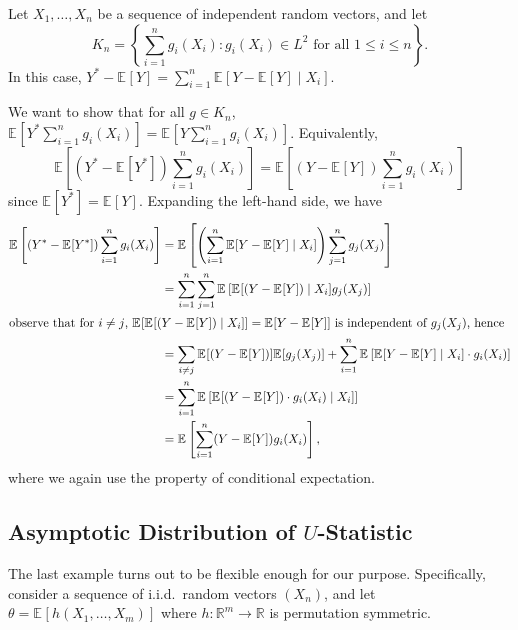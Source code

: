 \begin{eg}\label{eg:projection}
	Let \(X_1, \dots , X_n\) be a sequence of independent random vectors, and let
	\[
		K_n = \left\{ \sum_{i=1}^{n} g_i(X_i) \colon g_i(X_i) \in L^2 \text{ for all } 1 \leq i \leq n \right\}.
	\]
	In this case, \(Y^{\ast} - \mathbb{E}_{}[Y] = \sum_{i=1}^{n} \mathbb{E}_{}[Y - \mathbb{E}_{}[Y] \mid X_i] \).
\end{eg}
\begin{explanation}
	We want to show that for all \(g \in K_n\), \(\mathbb{E}_{}[Y^{\ast} \sum_{i=1}^{n} g_i(X_i)] = \mathbb{E}_{}[Y \sum_{i=1}^{n} g_i(X_i)] \). Equivalently,
	\[
		\mathbb{E}_{}\left[(Y^{\ast} - \mathbb{E}_{}[Y^{\ast} ] ) \sum_{i=1}^{n} g_i(X_i)\right]
		= \mathbb{E}_{}\left[(Y - \mathbb{E}_{}[Y] ) \sum_{i=1}^{n} g_i(X_i)\right]
	\]
	since \(\mathbb{E}_{}[Y^{\ast} ] = \mathbb{E}_{}[Y] \). Expanding the left-hand side, we have
	\begin{align*}
		\mathbb{E}_{}\left[(Y^{\ast} - \mathbb{E}_{}[Y^{\ast} ] ) \sum_{i=1}^{n} g_i(X_i)\right]
		 & = \mathbb{E}_{}\left[\left( \sum_{i=1}^{n} \mathbb{E}_{}[Y - \mathbb{E}_{}[Y] \mid X_i] \right) \sum_{j=1}^{n} g_j(X_j)\right]                                                            \\
		 & = \sum_{i=1}^{n} \sum_{j=1}^{n} \mathbb{E}_{}\left[\mathbb{E}_{}[(Y - \mathbb{E}_{}[Y] ) \mid X_i] g_j(X_j) \right]                                                                       \\
		\shortintertext{observe that for \(i\neq j\), \(\mathbb{E}_{}[\mathbb{E}_{}[(Y - \mathbb{E}_{}[Y] ) \mid X_i ]] = \mathbb{E}_{}[Y - \mathbb{E}_{}[Y] ] \) is independent of \(g_j(X_j)\), hence}
		 & = \sum_{i \neq j} \mathbb{E}_{}[(Y - \mathbb{E}_{}[Y] ) ] \mathbb{E}_{}[g_j(X_j) ] + \sum_{i=1}^{n} \mathbb{E}_{}\left[\mathbb{E}_{}[Y - \mathbb{E}_{}[Y] \mid X_i] \cdot g_i(X_i)\right] \\
		 & =  \sum_{i=1}^{n} \mathbb{E}_{}\left[\mathbb{E}_{}[(Y - \mathbb{E}_{}[Y]) \cdot g_i(X_i) \mid X_i]\right]                                                                                 \\
		 & = \mathbb{E}_{}\left[\sum_{i=1}^{n} (Y - \mathbb{E}_{}[Y] ) g_i(X_i) \right],
	\end{align*}
	where we again use the property of conditional expectation.
\end{explanation}

\subsection{Asymptotic Distribution of \(U\)-Statistic}
The last example turns out to be flexible enough for our purpose. Specifically, consider a sequence of i.i.d.\ random vectors \((X_n)\), and let \(\theta = \mathbb{E}_{}[h(X_1, \dots , X_m)] \) where \(h \colon \mathbb{R} ^m \to \mathbb{R} \) is permutation symmetric.

